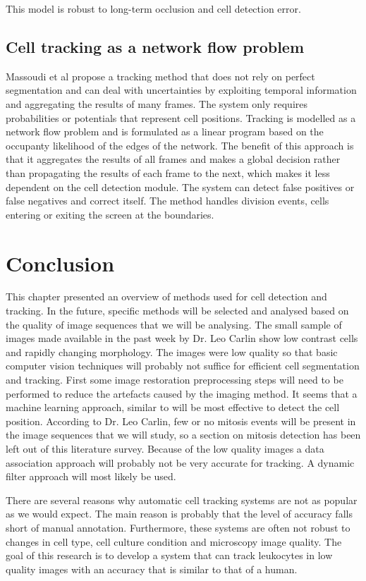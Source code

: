 \documentclass[12pt,a4paper,openany]{book}
\begin{document}
This model is robust to long-term occlusion and cell detection error.

\subsection{Cell tracking as a network flow problem}

Massoudi et al \cite{massoudi12} propose a tracking method that does not rely on perfect segmentation and can deal with uncertainties by exploiting temporal information and aggregating the results of many frames. The system only requires probabilities or potentials that represent cell positions. Tracking is modelled as a network flow problem and is formulated as a linear program based on the occupanty likelihood of the edges of the network. The benefit of this approach is that it aggregates the results of all frames and makes a global decision rather than propagating the results of each frame to the next, which makes it less dependent on the cell detection module. The system can detect false positives or false negatives and correct itself. The method handles division events, cells entering or exiting the screen at the boundaries.

\section{Conclusion}
\label{sec:conclusionmethods}
This chapter presented an overview of methods used for cell detection and tracking. In the future, specific methods will be selected and analysed based on the quality of image sequences that we will be analysing. The small sample of images made available in the past week by Dr. Leo Carlin show low contrast cells and rapidly changing morphology. The images were low quality so that basic computer vision techniques will probably not suffice for efficient cell segmentation and tracking. First some image restoration preprocessing steps will need to be performed to reduce the artefacts caused by the imaging method. It seems that a machine learning approach, similar to \cite{arteta13} will be most effective to detect the cell position. According to Dr. Leo Carlin, few or no mitosis events will be present in the image sequences that we will study, so a section on mitosis detection has been left out of this literature survey. Because of the low quality images a data association approach will probably not be very accurate for tracking. A dynamic filter approach will most likely be used.

There are several reasons why automatic cell tracking systems are not as popular as we would expect. The main reason is probably that the level of accuracy falls short of manual annotation. Furthermore, these systems are often not robust to changes in cell type, cell culture condition and microscopy image quality. The goal of this research is to develop a system that can track leukocytes in low quality images with an accuracy that is similar to that of a human. 
\end{document}
